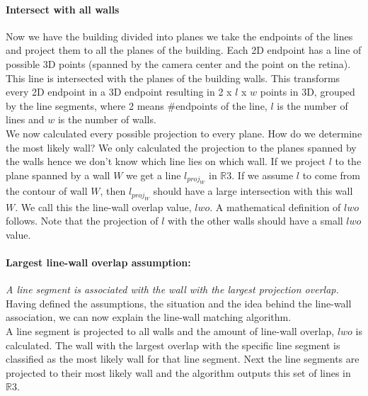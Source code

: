	\paragraph{Intersect with all walls}
	Now we have the building divided  into planes we take the endpoints of the
	lines and project them to all the planes of the building.  Each 2D endpoint
	has a line of possible 3D points (spanned by the camera center and the point
	on the retina). This line is intersected with the planes of the building
	walls.  This transforms every 2D endpoint in a 3D endpoint resulting in 2 x
	$l$ x $w$ points in 3D, grouped by the line segments, where 2 means
	\#endpoints of the line, $l$ is the number of lines and $w$ is the number of
	walls.\\

	We now calculated every possible projection to every plane. How do we
	determine the most likely wall?  We only calculated the projection to the
	planes spanned by the walls hence we don't know which line lies on which
	wall.  If we project $l$ to the plane spanned
	by a wall $W$ we get a line $l_{proj_W}$ in $\mathbb{R}3$.  If we assume
	$l$ to come from the contour of wall $W$, then $l_{proj_W}$ should have a large
	intersection with this wall $W$. 
	We call this the line-wall overlap value, $lwo$.  A mathematical
	definition of $lwo$ follows.  Note that the projection of $l$ with the
	other walls should have a small $lwo$ value.\\

	\paragraph{Largest line-wall overlap assumption:}
	\emph{A line segment is associated with the wall with the largest projection
	overlap.}\\

	Having defined the assumptions, the situation and the idea behind the
	line-wall association, we can now explain the line-wall matching algorithm.\\ 

	A line segment is projected to all walls and the amount of line-wall
	overlap, $lwo$ is calculated. The wall with the largest overlap with the specific line
segment is classified as the most likely wall for that line segment.
	Next the line segments are projected to their most likely wall and the
	algorithm outputs this set of lines in $\mathbb{R}3$. 
	

